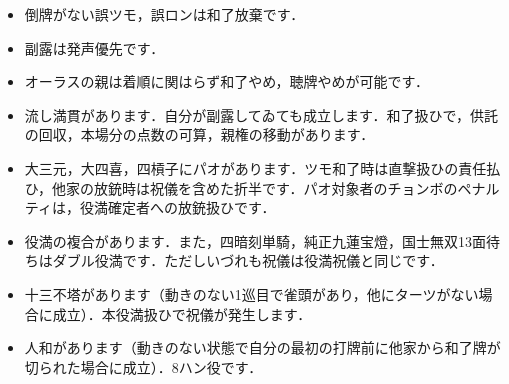 \documentclass[uplatex]{jsarticle}
\theoremstyle{definition}
\begin{document}
\begin{itemize}
    \item 倒牌がない誤ツモ，誤ロンは和了放棄です．
    \item 副露は発声優先です．
    \item オーラスの親は着順に関はらず和了やめ，聴牌やめが可能です．
    \item 流し満貫があります．自分が副露してゐても成立します．和了扱ひで，供託の回収，本場分の点数の可算，親権の移動があります．
    \item 大三元，大四喜，四槓子にパオがあります．ツモ和了時は直撃扱ひの責任払ひ，他家の放銃時は祝儀を含めた折半です．パオ対象者のチョンボのペナルティは，役満確定者への放銃扱ひです．
    \item 役満の複合があります．また，四暗刻単騎，純正九蓮宝燈，国士無双13面待ちはダブル役満です．ただしいづれも祝儀は役満祝儀と同じです．
    \item 十三不塔があります（動きのない1巡目で雀頭があり，他にターツがない場合に成立）．本役満扱ひで祝儀が発生します．
    \item 人和があります（動きのない状態で自分の最初の打牌前に他家から和了牌が切られた場合に成立）．8ハン役です．
    \end{itemize}
\end{document}
